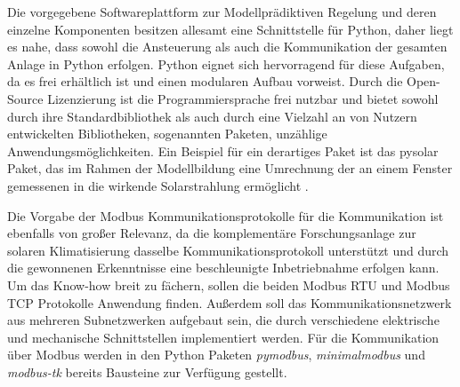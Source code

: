 
Die vorgegebene Softwareplattform zur Modellprädiktiven Regelung und deren einzelne Komponenten besitzen allesamt eine Schnittstelle für Python, daher liegt es nahe, dass sowohl die Ansteuerung als auch die Kommunikation der gesamten Anlage in Python erfolgen. Python eignet sich hervorragend für diese Aufgaben, da es frei erhältlich ist und einen modularen Aufbau vorweist. Durch die Open-Source Lizenzierung ist die Programmiersprache frei nutzbar und bietet sowohl durch ihre Standardbibliothek als auch durch eine Vielzahl an von Nutzern entwickelten Bibliotheken, sogenannten Paketen, unzählige Anwendungsmöglichkeiten. Ein Beispiel für ein derartiges Paket ist das pysolar Paket, das im Rahmen der Modellbildung eine Umrechnung der an einem Fenster gemessenen in die wirkende Solarstrahlung ermöglicht \cite[S.~2f.]{python}.

Die Vorgabe der Modbus Kommunikationsprotokolle für die Kommunikation ist ebenfalls von großer Relevanz, da die komplementäre Forschungsanlage zur solaren Klimatisierung dasselbe Kommunikationsprotokoll unterstützt und durch die gewonnenen Erkenntnisse eine beschleunigte Inbetriebnahme erfolgen kann. Um das Know-how breit zu fächern, sollen die beiden Modbus RTU und Modbus TCP Protokolle Anwendung finden. Außerdem soll das Kommunikationsnetzwerk aus mehreren Subnetzwerken aufgebaut sein, die durch verschiedene elektrische und mechanische Schnittstellen implementiert werden. Für die Kommunikation über Modbus werden in den Python Paketen \textit{pymodbus}, \textit{minimalmodbus} und \textit{modbus-tk} bereits Bausteine zur Verfügung gestellt.


